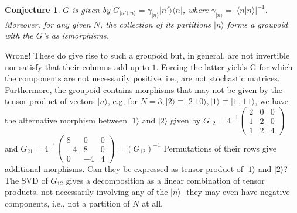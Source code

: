 \documentclass[twocolumn,aps,sort,nofootinbib]{revtex4}
\newtheorem{conjecture}{Conjecture}
\begin{document}
\begin{conjecture}
$G$ is given by 
$G_{{|n'\rangle}{|n\rangle}}=
\gamma_{|n\rangle}|n'\rangle\langle n|$, where 
$\gamma_{|n\rangle}=|\langle n|n\rangle|^{-1}$. Moreover, for any given $N$, the collection
of its partitions $|n\rangle$ forms a groupoid with the $G$'s as ismorphisms.
\end{conjecture}
Wrong! These do give rise to such a groupoid but, in general, are not invertible 
nor satisfy that their columns add up to $1$. Forcing the latter yields G for which the
components are not necessarily positive, i.e., are not stochastic matrices. Furthermore,
the groupoid contains morphisms that may not be given by the tensor product of vectors 
$|n\rangle$, e.g, for $N=3, |2\rangle\equiv |2\,1\,0\rangle, |1\rangle\equiv |1\,,1\,1\rangle$, 
we have the alternative morphism between $|1\rangle$ and $|2\rangle$ given by 
$G_{12}=4^{-1}\begin{pmatrix}
2 & 0 & 0\\
1 & 2 & 0 \\
1 & 2 & 4
\end{pmatrix}$
and
$G_{21}=4^{-1}\begin{pmatrix}
8 & 0 & 0\\
-4 & 8 & 0 \\
0 & -4 & 4
\end{pmatrix}=(G_{12})^{-1}$
Permutations of their rows give additional morphisms. Can they be expressed as tensor product 
of $|1\rangle$ and $|2\rangle$? 
The SVD of $G_{12}$ gives a decomposition as a linear combination of tensor products, not necessarily
involving any of the $|n\rangle$ -they may even have negative components, i.e., 
not a partition of $N$ at all.
\end{document}
